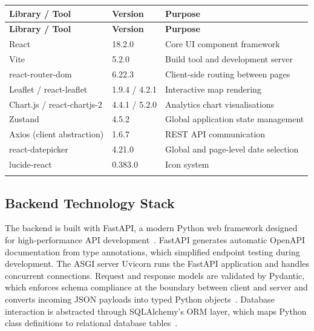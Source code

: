 \documentclass[12pt,a4paper]{report}
\begin{document}
\begin{tabularx}{\textwidth} {|p{5.5cm}
                  |p{2.5cm}
                  |X|}


\hline
\textbf{Library / Tool} & \textbf{Version} & \textbf{Purpose} \\
\hline
\endfirsthead

\hline
\textbf{Library / Tool} & \textbf{Version} & \textbf{Purpose} \\
\hline
\endhead

React & 18.2.0 & Core UI component framework \\
\hline
Vite & 5.2.0 & Build tool and development server \\
\hline
react-router-dom & 6.22.3 & Client-side routing between pages \\
\hline
Leaflet / react-leaflet & 1.9.4 / 4.2.1 & Interactive map rendering \\
\hline
Chart.js / react-chartjs-2 & 4.4.1 / 5.2.0 & Analytics chart visualisations \\
\hline
Zustand & 4.5.2 & Global application state management \\
\hline
Axios (client abstraction) & 1.6.7 & REST API communication \\
\hline
react-datepicker & 4.21.0 & Global and page-level date selection \\
\hline
lucide-react & 0.383.0 & Icon system \\
\hline

\caption{\centering Frontend technology stack}
\label{tab:frontend_stack} \\

\end{tabularx}

\subsection{Backend Technology Stack}
\label{subsec:backend}

The backend is built with FastAPI, a modern Python web framework designed for high-performance API development~\cite{fastapi2024}. FastAPI generates automatic OpenAPI documentation from type annotations, which simplified endpoint testing during development. The ASGI server Uvicorn runs the FastAPI application and handles concurrent connections. Request and response models are validated by Pydantic, which enforces schema compliance at the boundary between client and server and converts incoming JSON payloads into typed Python objects~\cite{pydantic2024}. Database interaction is abstracted through SQLAlchemy's ORM layer, which maps Python class definitions to relational database tables~\cite{sqlalchemy2024}.
\end{document}

